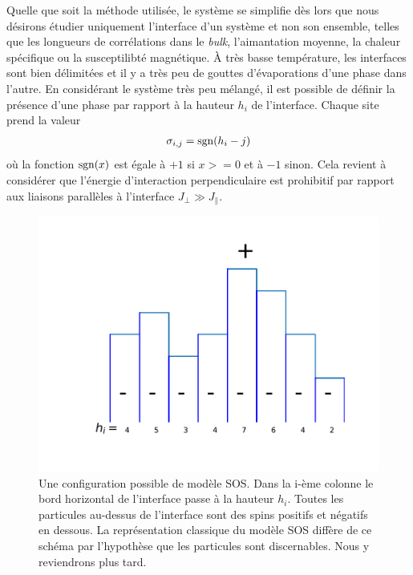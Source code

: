 Quelle que soit la méthode utilisée, le système se simplifie dès lors que nous désirons étudier uniquement l'interface d'un système et non son ensemble, telles que les longueurs de corrélations dans le \textit{bulk}, l'aimantation moyenne, la chaleur spécifique ou la susceptilibté magnétique. À très basse température, les interfaces sont bien délimitées et il y a très peu de gouttes d'évaporations d'une phase dans l'autre. En considérant le système très peu mélangé, il est possible de définir la présence d'une phase par rapport à la hauteur $h_i$ de l'interface. Chaque site prend la valeur
\begin{align*}
	\sigma_{i,j} = \operatorname{sgn}(h_i-j)
\end{align*}
où la fonction $\operatorname{sgn}(x)$ est égale à $+1$ si $x>=0$ et à $-1$ sinon. Cela revient à considérer que l'énergie d'interaction perpendiculaire est prohibitif par rapport aux liaisons parallèles à l'interface $J_\perp \gg J_\parallel$. 

\begin{figure}
	\centering
	\includegraphics[scale=1]{isingtosos/sos-indiscernable.pdf}
	\caption{Une configuration possible de modèle SOS. Dans la i-ème colonne le bord horizontal de l'interface passe à la hauteur $h_i$. Toutes les particules au-dessus de l'interface sont des spins positifs et négatifs en dessous. La représentation classique du modèle SOS diffère de ce schéma par l'hypothèse que les particules sont discernables. Nous y reviendrons plus tard.}
\end{figure}


